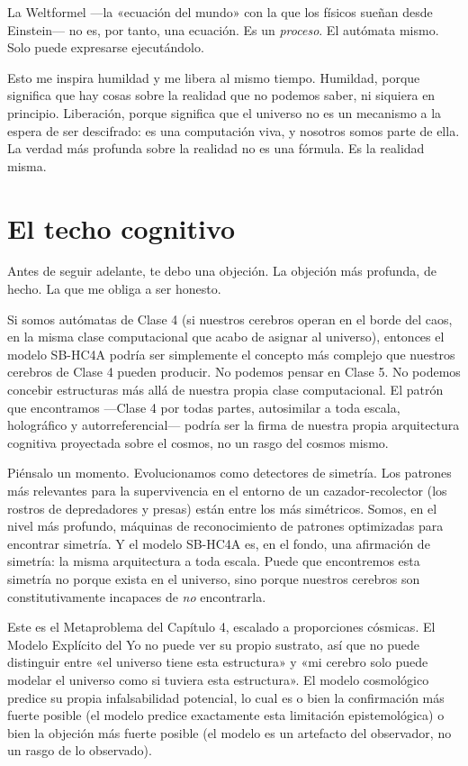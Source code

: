 \documentclass[11pt, twoside, openright]{book}
\begin{document}
La Weltformel ---la «ecuación del mundo» con la que los físicos sueñan desde Einstein--- no es, por tanto, una ecuación. Es un \textit{proceso}. El autómata mismo. Solo puede expresarse ejecutándolo.

Esto me inspira humildad y me libera al mismo tiempo. Humildad, porque significa que hay cosas sobre la realidad que no podemos saber, ni siquiera en principio. Liberación, porque significa que el universo no es un mecanismo a la espera de ser descifrado: es una computación viva, y nosotros somos parte de ella. La verdad más profunda sobre la realidad no es una fórmula. Es la realidad misma.


\section*{El techo cognitivo}

Antes de seguir adelante, te debo una objeción. La objeción más profunda, de hecho. La que me obliga a ser honesto.

Si somos autómatas de Clase 4 (si nuestros cerebros operan en el borde del caos, en la misma clase computacional que acabo de asignar al universo), entonces el modelo SB-HC4A podría ser simplemente el concepto más complejo que nuestros cerebros de Clase 4 pueden producir. No podemos pensar en Clase 5. No podemos concebir estructuras más allá de nuestra propia clase computacional. El patrón que encontramos ---Clase 4 por todas partes, autosimilar a toda escala, holográfico y autorreferencial--- podría ser la firma de nuestra propia arquitectura cognitiva proyectada sobre el cosmos, no un rasgo del cosmos mismo.

Piénsalo un momento. Evolucionamos como detectores de simetría. Los patrones más relevantes para la supervivencia en el entorno de un cazador-recolector (los rostros de depredadores y presas) están entre los más simétricos. Somos, en el nivel más profundo, máquinas de reconocimiento de patrones optimizadas para encontrar simetría. Y el modelo SB-HC4A es, en el fondo, una afirmación de simetría: la misma arquitectura a toda escala. Puede que encontremos esta simetría no porque exista en el universo, sino porque nuestros cerebros son constitutivamente incapaces de \textit{no} encontrarla.

Este es el Metaproblema del Capítulo 4, escalado a proporciones cósmicas. El Modelo Explícito del Yo no puede ver su propio sustrato, así que no puede distinguir entre «el universo tiene esta estructura» y «mi cerebro solo puede modelar el universo como si tuviera esta estructura». El modelo cosmológico predice su propia infalsabilidad potencial, lo cual es o bien la confirmación más fuerte posible (el modelo predice exactamente esta limitación epistemológica) o bien la objeción más fuerte posible (el modelo es un artefacto del observador, no un rasgo de lo observado).
\end{document}
